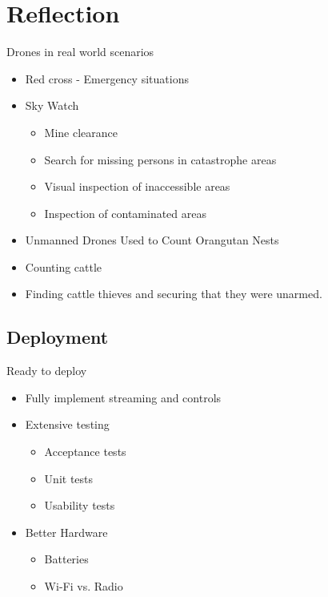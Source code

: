 

\author{Rasmus Steiniche}
\section{Reflection}
\begin{frame}{Drones in real world scenarios}
\begin{itemize}
	\item Red cross - Emergency situations
	\item Sky Watch
	\begin{itemize}
		\item Mine clearance
		\item Search for missing persons in catastrophe areas
		\item Visual inspection of inaccessible areas
		\item Inspection of contaminated areas
	\end{itemize}
	\item Unmanned Drones Used to Count Orangutan Nests
	\item Counting cattle
	\item Finding cattle thieves and securing that they were unarmed.
\end{itemize}
\end{frame}

\subsection{Deployment}
\begin{frame}{Ready to deploy}
\begin{itemize}
	\item Fully implement streaming and controls
	\item Extensive testing
	\begin{itemize}
		\item Acceptance tests
		\item Unit tests
		\item Usability tests
	\end{itemize}
	\item Better Hardware
	\begin{itemize}
		\item Batteries
		\item Wi-Fi vs. Radio
	\end{itemize}
\end{itemize}
\end{frame}

